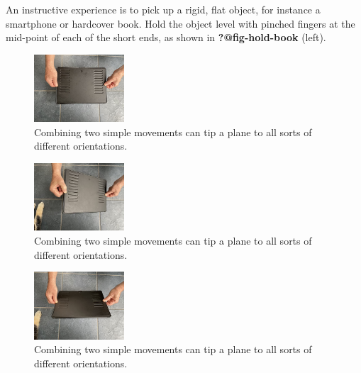 \documentclass[
  letterpaper,
  DIV=11,
  numbers=noendperiod,
  oneside]{scrreprt}
\begin{document}
An instructive experience is to pick up a rigid, flat object, for
instance a smartphone or hardcover book. Hold the object level with
pinched fingers at the mid-point of each of the short ends, as shown in
\textbf{?@fig-hold-book} (left).

\begin{figure}

{\centering \includegraphics[width=0.3\textwidth,height=\textheight]{Differentiation/www/level-book.png}

}

\caption{\label{fig-hold-book-1}Combining two simple movements can tip a
plane to all sorts of different orientations.}

\end{figure}

\begin{figure}

{\centering \includegraphics[width=0.3\textwidth,height=\textheight]{Differentiation/www/rotated-book.png}

}

\caption{\label{fig-hold-book-2}Combining two simple movements can tip a
plane to all sorts of different orientations.}

\end{figure}

\begin{figure}

{\centering \includegraphics[width=0.3\textwidth,height=\textheight]{Differentiation/www/tipped-book.png}

}

\caption{\label{fig-hold-book-3}Combining two simple movements can tip a
plane to all sorts of different orientations.}

\end{figure}
\end{document}
